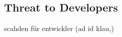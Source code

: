 \subsection{Threat to Developers}\label{subsection:piracy-developers}
scahden für entwickler (ad id klau,)\newline
